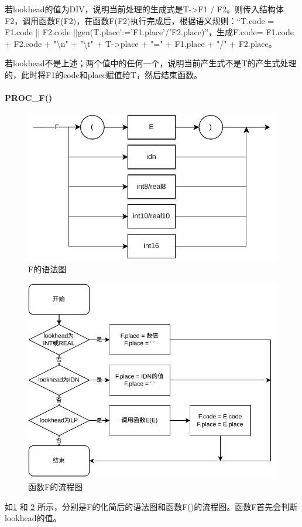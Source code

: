 \documentclass{ctexrep}
\begin{document}
若lookhead的值为DIV，说明当前处理的生成式是T->F1 / F2。则传入结构体F2，调用函数F(F2)，在函数F(F2)执行完成后，根据语义规则：“T.code = F1.code || F2.code ||gen(T.place’:=’F1.place’/’F2.place)”，生成F.code= F1.code + F2.code + "\textbackslash{}n" + "\textbackslash{}t" + T->place + "=" + F1.place + "/" + F2.place。

若lookhead不是上述；两个值中的任何一个，说明当前产生式不是T的产生式处理的，此时将F1的code和place赋值给T，然后结束函数。

\paragraph{PROC\_F()}
\begin{figure}
    \centering
    \includegraphics[width = .8\linewidth]{f.drawio.pdf}
    \caption{F的语法图}
    \label{fig:f}
\end{figure}
\begin{figure}
    \centering
    \includegraphics[width = .8\linewidth]{001F.drawio.png.pdf}
    \caption{函数F的流程图}
    \label{fig:proc-f}
\end{figure}
如\cref{fig:f} 和 \cref{fig:proc-f} 所示，分别是F的化简后的语法图和函数F()的流程图。函数F首先会判断lookhead的值。
\end{document}
